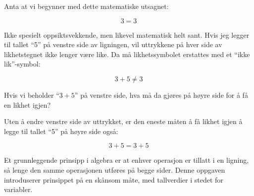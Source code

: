 

Anta at vi begynner med dette matematiske utsagnet:

$$3 = 3$$

Ikke spesielt oppsiktsvekkende, men likevel matematisk helt sant. Hvis jeg legger til tallet ``5'' på venstre side av ligningen, vil uttrykkene på hver side av likhetstegnet ikke lenger være like. Da må likhetssymbolet erstattes med et ``ikke lik''-symbol:

$$3 + 5 \not = 3$$ 

Hvis vi beholder ``$3 + 5$'' på venstre side, hva må da gjøres på høyre side for å få en likhet igjen?







Uten å endre venstre side av uttrykket, er den eneste måten å få likhet igjen å legge til tallet ``5'' på høyre side også:

$$3 + 5 = 3 + 5$$ 







Et grunnleggende prinsipp i algebra er at enhver operasjon er tillatt i en ligning, så lenge den samme operasjonen utføres på begge sider. Denne oppgaven introduserer prinsippet på en skånsom måte, med tallverdier i stedet for variabler.


